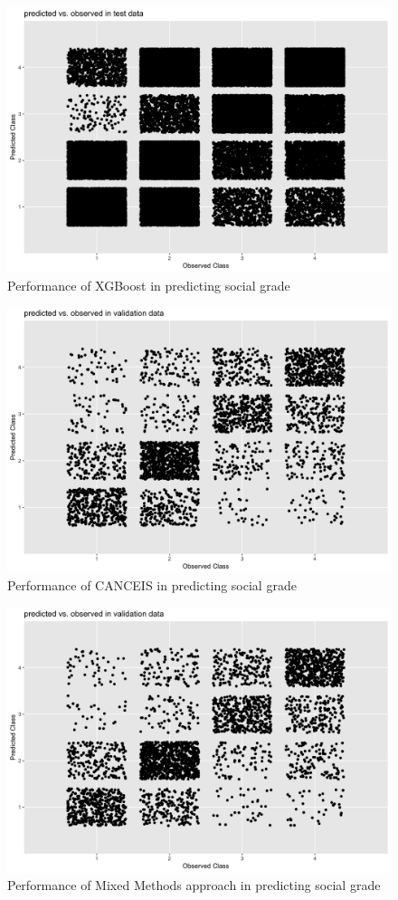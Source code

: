 \documentclass[]{book}
\begin{document}
\begin{figure}
\centering
\includegraphics{images/SGXGqplot.png}
\caption{Performance of XGBoost in predicting social grade}
\end{figure}

\begin{figure}
\centering
\includegraphics{images/SGCANCEISqplot.png}
\caption{Performance of CANCEIS in predicting social grade}
\end{figure}

\begin{figure}
\centering
\includegraphics{images/SGCANCEISXGqplot.png}
\caption{Performance of Mixed Methods approach in predicting social
grade}
\end{figure}
\end{document}
